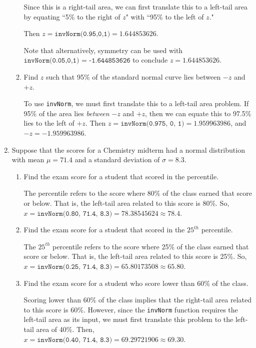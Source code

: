 \documentclass{article}
\newcommand{\answer}[1]{\color{red}#1}
\begin{document}
\begin{enumerate}
\begin{enumerate}
	{\answer Since this is a right-tail area, we can first translate this to a left-tail area by equating ``5\% to the right of $z$" with ``95\% to the left of $z$."  
	
	Then $z = \texttt{invNorm(0.95,0,1)} = 1.644853626$. 
	
	Note that alternatively, symmetry can be used with  $\texttt{invNorm(0.05,0,1) = -1.644853626}$ to conclude $z=1.644853626$.
	} 

	\item Find $z$ such that 95\% of the standard normal curve lies between $-z$ and $+z$. 
	
	{\answer To use \texttt{invNorm}, we must first translate this to a left-tail area problem.  If 95\% of the area lies {\em between} $-z$ and $+z$, then we can equate this to 97.5\% lies to the left of $+z$.  
	Then $z = \texttt{invNorm(0.975, 0, 1)} = 1.959963986$, and $-z = -1.959963986$.
	} 
	
	\end{enumerate}
	
\item Suppose that the scores for a Chemistry midterm had a normal distribution with mean $\mu = 71.4$ and a standard deviation of $\sigma = 8.3$.

	\begin{enumerate}
	
	\item Find the exam score for a student that scored in the  percentile. 
	
	{\answer The  percentile refers to the score where 80\% of the class earned that score or below.  That is, the left-tail area related to this score is 80\%. So, $x = \texttt{invNorm(0.80, 71.4, 8.3)} = 78.38545624 \approx 78.4$.
	} 
	
	\item Find the exam score for a student that scored in the $25^{th}$ percentile. 
	
	{\answer The $25^{th}$ percentile refers to the score where 25\% of the class earned that score or below.  That is, the left-tail area related to this score is 25\%. So, $x = \texttt{invNorm(0.25, 71.4, 8.3)} = 65.80173508 \approx 65.80$.
	} 
	
	\item Find the exam score for a student who score lower than 60\% of the class. 
	
	{\answer Scoring lower than 60\% of the class implies that the right-tail area related to this score is 60\%.  However, since the \texttt{invNorm} function requires the left-tail area as its input, we must first translate this problem to the left-tail area of 40\%.	Then,  $x = \texttt{invNorm(0.40, 71.4, 8.3)} = 69.29721906 \approx 69.30$.
	} 
	\end{enumerate}


\end{enumerate}
\end{document}
